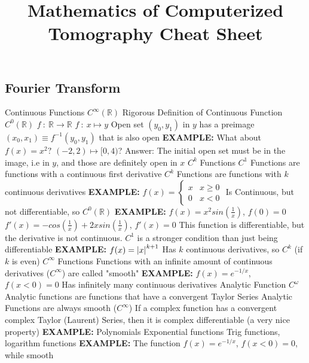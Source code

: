 \documentclass[14pt]{extarticle}
\title{Mathematics of Computerized Tomography Cheat Sheet}
\begin{document}
	\maketitle	
	\begin{outline}		
		\section*{Fourier Transform}
			\1	Continuous Functions $C^{\infty}(\mathbb{R})$
				\2	Rigorous Definition of Continuous Function $C^0(\mathbb{R})$
					\3	$f~:~\mathbb{R} \rightarrow \mathbb{R}$
					\3	$f~:~x \mapsto y$
					\3	Open set $(y_0,y_1)$ in $y$ has a preimage $(x_0,x_1) \equiv f^{-1}(y_0,y_1)$
							that is also open
					\3	\textbf{EXAMPLE:} What about $f(x) = x^2?$
						\4	$(-2,2) \mapsto [0,4)$?
						\4	Answer:	The initial open set must be in the image, i.e in $y$,
								and those are definitely open in $x$	
				\2	$C^k$ Functions
					\3	$C^1$ Functions are functions with a continuous first derivative
					\3	$C^k$ Functions are functions with $k$ continuous derivatives
					\3	\textbf{EXAMPLE:}
						\4	$f(x) = \begin{cases} x & x \ge 0 \\ 0 & x < 0   \end{cases}$
						\4	Is Continuous, but not differentiable, so $C^0(\mathbb{R})$
					\3	\textbf{EXAMPLE:}
						\4	$f(x) = x^2sin(\frac{1}{x})$, $f(0) = 0$
						\4	$f'(x) = -cos(\frac{1}{x}) + 2x sin(\frac{1}{x})$, $f'(x) = 0$
						\4	This function is differentiable, but the derivative is not 
								continuous.  
						\4	$C^1$ is a stronger condition than just being differentiable
					\3	\textbf{EXAMPLE:}
						\4	$f(x) = \abs{x}^{k+1}$
						\4	Has $k$ continuous derivatives, so $C^{k}$ (if $k$ is even)
				\2	$C^{\infty}$ Functions
					\3	Functions with an infinite amount of continuous derivatives 
							($C^{\infty}$) are called "smooth"
					\3	\textbf{EXAMPLE:}
						\4	$f(x) = e^{-1/x}$, $f(x<0) = 0$
						\4	Has infinitely many continuous derivatives
				\2	Analytic Function $C^{\omega}$
					\3	Analytic functions are functions that have a convergent Taylor
							Series
					\3	Analytic Functions are always smooth ($C^{\infty}$)
					\3	If a complex function has a convergent complex Taylor (Laurent)
							Series, then it is complex differentiable (a very nice property)
					\3	\textbf{EXAMPLE:}
						\4	Polynomials
						\4	Exponential functions
						\4	Trig functions, logarithm functions
					\3	\textbf{EXAMPLE:}
						\4	The function $f(x) = e^{-1/x}$, $f(x<0) = 0$, while smooth

\end{outline}
\end{document}
